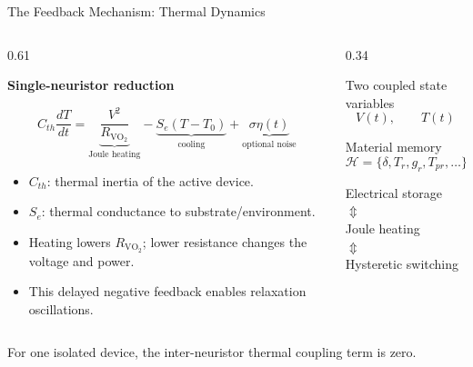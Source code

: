 \documentclass[aspectratio=169]{beamer}
\newcommand{\slidesource}[1]{%
    \vfill
    {\tiny\color{gray}#1}
}
\begin{document}
\begin{frame}{The Feedback Mechanism: Thermal Dynamics}

\begin{columns}[T,onlytextwidth]
\begin{column}{0.61\textwidth}

\textbf{Single-neuristor reduction}

\vspace{0.15cm}

\[
C_{th}\frac{dT}{dt}
=
\underbrace{\frac{V^2}{R_{\mathrm{VO_2}}}}_{\text{Joule heating}}
-
\underbrace{S_e(T-T_0)}_{\text{cooling}}
+
\underbrace{\sigma\eta(t)}_{\text{optional noise}}
\]

\vspace{0.2cm}

\begin{itemize}
    \item \(C_{th}\): thermal inertia of the active device.
    \item \(S_e\): thermal conductance to substrate/environment.
    \item Heating lowers \(R_{\mathrm{VO_2}}\); lower resistance changes the voltage and power.
    \item This delayed negative feedback enables relaxation oscillations.
\end{itemize}

\end{column}

\begin{column}{0.34\textwidth}
\begin{block}{Two coupled state variables}
\[
V(t),\qquad T(t)
\]
\end{block}

\begin{block}{Material memory}
\[
\mathcal H=
\{\delta,T_r,g_r,T_{pr},\ldots\}
\]
\end{block}

\begin{center}
\small
Electrical storage\\
\(\Updownarrow\)\\
Joule heating\\
\(\Updownarrow\)\\
Hysteretic switching
\end{center}
\end{column}
\end{columns}

\slidesource{For one isolated device, the inter-neuristor thermal coupling term is zero.}
\end{frame}
\end{document}
